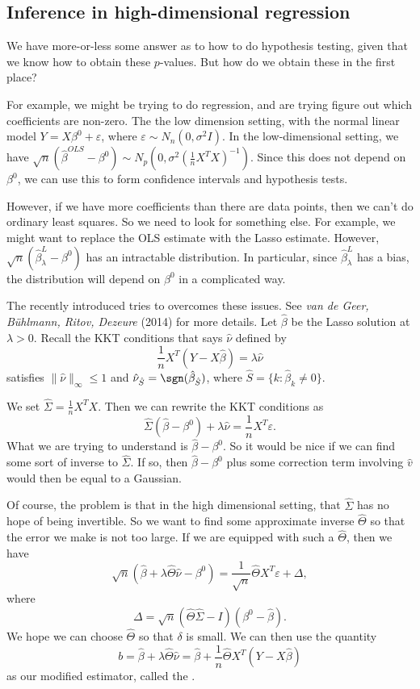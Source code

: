 \documentclass[a4paper]{article}
\begin{document}
\subsection{Inference in high-dimensional regression}
We have more-or-less some answer as to how to do hypothesis testing, given that we know how to obtain these $p$-values. But how do we obtain these in the first place?

For example, we might be trying to do regression, and are trying figure out which coefficients are non-zero. The the low dimension setting, with the normal linear model $Y = X\beta^0 + \varepsilon$, where $\varepsilon \sim N_n(0, \sigma^2 I)$. In the low-dimensional setting, we have $\sqrt{n}(\hat{\beta}^{OLS} - \beta^0) \sim N_p(0, \sigma^2(\frac{1}{n} X^T X)^{-1})$. Since this does not depend on $\beta^0$, we can use this to form confidence intervals and hypothesis tests.

However, if we have more coefficients than there are data points, then we can't do ordinary least squares. So we need to look for something else. For example, we might want to replace the OLS estimate with the Lasso estimate. However, $\sqrt{n}(\hat{\beta}_\lambda^L - \beta^0)$ has an intractable distribution. In particular, since $\hat{\beta}_\lambda^L$ has a bias, the distribution will depend on $\beta^0$ in a complicated way.

The recently introduced  tries to overcomes these issues. See \emph{van de Geer, B\"uhlmann, Ritov, Dezeure} (2014) for more details. Let $\hat{\beta}$ be the Lasso solution at $\lambda > 0$. Recall the KKT conditions that says $\hat{\nu}$ defined by
\[
  \frac{1}{n} X^T (Y - X \hat{\beta}) = \lambda \hat{\nu}
\]
satisfies $\|\hat{\nu}\|_\infty \leq 1$ and $\hat{\nu}_{\hat{S}} = \sgn (\hat{\beta}_{\hat{S}})$, where $\hat{S} = \{k : \hat{\beta}_k \not= 0\}$.

We set $\hat{\Sigma} = \frac{1}{n} X^T X$. Then we can rewrite the KKT conditions as
\[
  \hat{\Sigma} (\hat{\beta} - \beta^0) + \lambda \hat{\nu} = \frac{1}{n} X^T \varepsilon.
\]
What we are trying to understand is $\hat{\beta} - \beta^0$. So it would be nice if we can find some sort of inverse to $\hat{\Sigma}$. If so, then $\hat{\beta} - \beta^0$ plus some correction term involving $\hat{v}$ would then be equal to a Gaussian.

Of course, the problem is that in the high dimensional setting, that $\hat{\Sigma}$ has no hope of being invertible. So we want to find some approximate inverse $\hat{\Theta}$ so that the error we make is not too large. If we are equipped with such a $\hat{\Theta}$, then we have
\[
  \sqrt{n} (\hat{\beta} + \lambda \hat{\Theta} \hat{\nu} - \beta^0) = \frac{1}{\sqrt{n}} \hat{\Theta} X^T \varepsilon + \Delta,
\]
where
\[
  \Delta = \sqrt{n}(\hat{\Theta} \hat{\Sigma} - I)(\beta^0 - \hat{\beta}).
\]
We hope we can choose $\hat{\Theta}$ so that $\delta$ is small. We can then use the quantity
\[
  b = \hat{\beta} + \lambda \hat{\Theta} \hat{\nu} = \hat{\beta} + \frac{1}{n} \hat{\Theta} X^T (Y - X \hat{\beta})
\]
as our modified estimator, called the .
\end{document}
